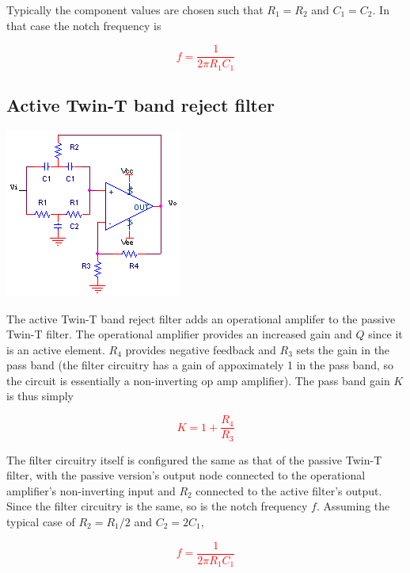 Typically the component values are chosen such that $R_1 = R_2$ and $C_1 = C_2$.
In that case the notch frequency \autocite[324]{op-amps-for-everyone} is

\textcolor{red}{
\begin{equation}
f = \frac{1}{2\pi R_{1}C_{1}}
\label{eq:passiveWienRobinson}
\end{equation}
}

\subsection{Active Twin-T band reject filter}
\begin{center}
	\includegraphics{schematics/activeTwinTbandrejectfilter.PNG}
\end{center}
The active Twin-T band reject filter adds an operational amplifer to the passive Twin-T filter.
The operational amplifier provides an increased gain and $Q$ since it is an active element.
$R_4$ provides negative feedback and $R_3$ sets the gain in the pass band (the filter circuitry has a gain of appoximately 1 in the pass band, so the circuit is essentially a non-inverting op amp amplifier).
The pass band gain $K$ is thus simply

\textcolor{red}{
\begin{equation}
K = 1 + \frac{R_{4}}{R_{3}}
\end{equation}
}

The filter circuitry itself is configured the same as that of the passive Twin-T filter, with the passive version's output node connected to the operational amplifier's non-inverting input and $R_2$ connected to the active filter's output.
Since the filter circuitry is the same, so is the notch frequency $f$.
Assuming the typical case of $R_2 = R_1/2$ and $C_2 = 2C_1$,

\textcolor{red}{
\begin{equation}
f = \frac{1}{2\pi R_{1}C_{1}}
\end{equation}
}

